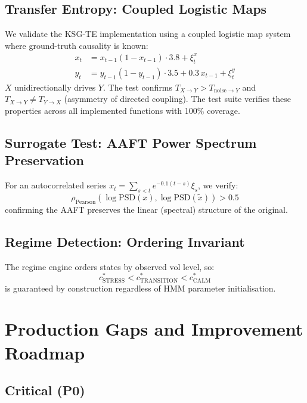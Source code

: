 \documentclass[11pt]{article}
\begin{document}
\subsection{Transfer Entropy: Coupled Logistic Maps}

We validate the KSG-TE implementation using a coupled logistic map system where ground-truth causality is known:
\begin{align}
x_t &= x_{t-1}(1 - x_{t-1}) \cdot 3.8 + \xi_t^x \label{eq:logistic-x} \\
y_t &= y_{t-1}(1 - y_{t-1}) \cdot 3.5 + 0.3\, x_{t-1} + \xi_t^y \label{eq:logistic-y}
\end{align}
$X$ unidirectionally drives $Y$. The test confirms $T_{X \to Y} > T_{\text{noise} \to Y}$ and $T_{X \to Y} \neq T_{Y \to X}$ (asymmetry of directed coupling). The test suite verifies these properties across all implemented functions with 100\% coverage.

\subsection{Surrogate Test: AAFT Power Spectrum Preservation}

For an autocorrelated series $x_t = \sum_{s < t} e^{-0.1(t-s)} \xi_s$, we verify:
\begin{equation}
\rho_{\text{Pearson}}\left(\log \text{PSD}(x), \log \text{PSD}(\tilde{x})\right) > 0.5
\label{eq:aaft-psd}
\end{equation}
confirming the AAFT preserves the linear (spectral) structure of the original.

\subsection{Regime Detection: Ordering Invariant}

The regime engine orders states by observed vol level, so:
\begin{equation}
c^*_{\text{STRESS}} < c^*_{\text{TRANSITION}} < c^*_{\text{CALM}}
\label{eq:ordering-invariant}
\end{equation}
is guaranteed by construction regardless of HMM parameter initialisation.

\section{Production Gaps and Improvement Roadmap}

\subsection{Critical (P0)}
\end{document}
